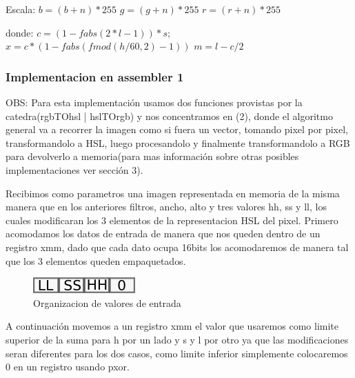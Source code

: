 \documentclass[a4paper]{article}
\begin{document}
\begin{enumerate}
		Escala:\newline
		$b = (b+n) * 255$\newline
		$g = (g+n) * 255$\newline
		$r = (r+n) * 255$\newline

		donde:\newline
		$c = ( 1 - fabs( 2*l - 1 )) * s;$\newline
		$x = c * ( 1 - fabs( fmod( h/60, 2 ) - 1 ) )$\newline
		$m = l - c / 2$\newline


\end{enumerate}

\subsubsection{Implementacion en assembler 1}
OBS: Para esta implementación usamos dos funciones provistas por la catedra(rgbTOhsl | hslTOrgb) y nos concentramos en (2), donde el algoritmo general va a recorrer la imagen como si fuera un vector, tomando pixel por pixel, transformandolo a HSL, luego procesandolo y finalmente transformandolo a RGB para devolverlo a memoria(para mas información sobre otras posibles implementaciones ver sección 3).



Recibimos como parametros una imagen representada en memoria de la misma manera que en los anteriores filtros, ancho, alto y tres valores hh, ss y ll, los cuales modificaran los 3 elementos de la representacion HSL del pixel.
Primero acomodamos los datos de entrada de manera que nos queden dentro de un registro xmm, dado que cada dato ocupa 16bits los acomodaremos de manera tal que los 3 elementos queden empaquetados.

\begin{figure}[H]
\centering
\includegraphics[scale=0.8]{imagenes/llsshh.png}
\caption{Organizacion de valores de entrada}
\label{lshValue}
\end{figure}

A continuación movemos a un registro xmm el valor que usaremos como limite superior de la suma para h por un lado y s y l por otro ya que las modificaciones seran diferentes para los dos casos, como limite inferior simplemente colocaremos 0 en un registro usando pxor.
\end{document}

